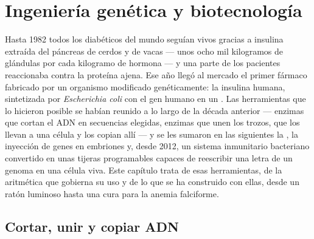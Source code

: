 \chapter{Ingeniería genética y biotecnología}\label{ch:b3:genetic-engineering}

Hasta 1982 todos los diabéticos del mundo seguían vivos gracias a
insulina extraída del páncreas de cerdos y de vacas --- unos ocho mil
kilogramos de glándulas por cada kilogramo de hormona --- y una parte de
los pacientes reaccionaba contra la proteína ajena. Ese año llegó al
mercado el primer fármaco fabricado por un organismo modificado
genéticamente: la insulina humana, sintetizada por \emph{Escherichia
coli} con el gen humano en un . Las herramientas que lo hicieron
posible se habían reunido a lo largo de la década anterior --- enzimas
que cortan el ADN en secuencias elegidas, enzimas que unen los trozos,
 que los llevan a una célula y los copian allí --- y se les
sumaron en las siguientes la , la
inyección de genes en embriones y, desde 2012, un sistema inmunitario
bacteriano convertido en unas tijeras programables capaces de reescribir
una letra de un genoma en una célula viva. Este capítulo trata de esas
herramientas, de la aritmética que gobierna su uso y de lo que se ha
construido con ellas, desde un ratón luminoso hasta una cura para la
anemia falciforme.

\section{Cortar, unir y copiar ADN}

